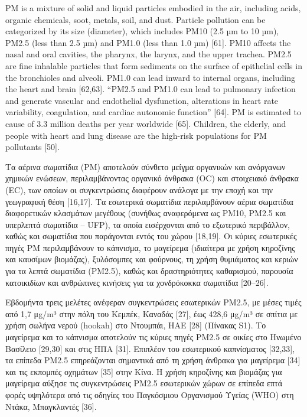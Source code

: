 PM is a mixture of solid and liquid particles embodied in the air, including acids, organic chemicals, soot, metals, soil, and dust. Particle pollution can be categorized by its size (diameter), which includes PM10 (2.5 µm to 10 µm), PM2.5 (less than 2.5 µm) and PM1.0 (less than 1.0 µm) [61]. PM10 affects the nasal and oral cavities, the pharynx, the larynx, and the upper trachea. PM2.5 are fine inhalable particles that form sediments on the surface of epithelial cells in the bronchioles and alveoli. PM1.0 can lead inward to internal organs, including the heart and brain [62,63]. “PM2.5 and PM1.0 can lead to pulmonary infection and generate vascular and endothelial dysfunction, alterations in heart rate variability, coagulation, and cardiac autonomic function” [64]. PM is estimated to cause of 3.3 million deaths per year worldwide [65]. Children, the elderly, and people with heart and lung disease are the high-risk populations for PM pollutants [50].

\cite{su12219045}

Τα αέρινα σωματίδια (PM) αποτελούν σύνθετο μείγμα οργανικών και ανόργανων χημικών ενώσεων, περιλαμβάνοντας οργανικό άνθρακα (OC) και στοιχειακό άνθρακα (EC), των οποίων οι συγκεντρώσεις διαφέρουν ανάλογα με την εποχή και την γεωγραφική θέση [16,17]. Τα εσωτερικά σωματίδια περιλαμβάνουν αέρια σωματίδια διαφορετικών κλασμάτων μεγέθους (συνήθως αναφερόμενα ως PM10, PM2.5 και υπερλεπτά σωματίδια – UFP), τα οποία εισέρχονται από το εξωτερικό περιβάλλον, καθώς και σωματίδια που παράγονται εντός του χώρου [18,19]. Οι κύριες εσωτερικές πηγές PM περιλαμβάνουν το κάπνισμα, το μαγείρεμα (ιδιαίτερα με χρήση κηροζίνης και καυσίμων βιομάζας), ξυλόσομπες και φούρνους, τη χρήση θυμιάματος και κεριών για τα λεπτά σωματίδια (PM2.5), καθώς και δραστηριότητες καθαρισμού, παρουσία κατοικιδίων και ανθρώπινες κινήσεις για τα χονδρόκοκκα σωματίδια [20–26].

Εβδομήντα τρεις μελέτες ανέφεραν συγκεντρώσεις εσωτερικών PM2.5, με μέσες τιμές από 1,7 μg/m³ στην πόλη του Κεμπέκ, Καναδάς [27], έως 428,6 μg/m³ σε σπίτια με χρήση σωλήνα νερού (hookah) στο Ντουμπάι, ΗΑΕ [28] (Πίνακας S1). Το μαγείρεμα και το κάπνισμα αποτελούν τις κύριες πηγές PM2.5 σε οικίες στο Ηνωμένο Βασίλειο [29,30] και στις ΗΠΑ [31]. Επιπλέον του εσωτερικού καπνίσματος [32,33], τα επίπεδα PM2.5 επηρεάζονται σημαντικά από τη χρήση άνθρακα για μαγείρεμα [34] και τις εκπομπές οχημάτων [35] στην Κίνα. Η χρήση κηροζίνης και βιομάζας για μαγείρεμα αύξησε τις συγκεντρώσεις PM2.5 εσωτερικών χώρων σε επίπεδα επτά φορές υψηλότερα από τις οδηγίες του Παγκόσμιου Οργανισμού Υγείας (WHO) στη Ντάκα, Μπαγκλαντές [36].

